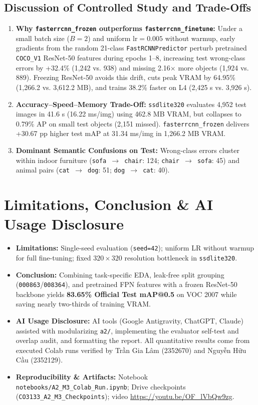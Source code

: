 \documentclass[twoside,final]{hcmut-report}
\begin{document}
\subsection{\textbf{Discussion of Controlled Study and Trade-Offs}}
\begin{enumerate}[itemsep=2pt,topsep=3pt]
    \item \textbf{Why \texttt{fasterrcnn\_frozen} outperforms \texttt{fasterrcnn\_finetune}:} Under a small batch size ($B=2$) and uniform $\text{lr}=0.005$ without warmup, early gradients from the random 21-class \texttt{FastRCNNPredictor} perturb pretrained \texttt{COCO\_V1} ResNet-50 features during epochs 1--8, increasing test wrong-class errors by +32.4\% (1,242 vs. 938) and missing 2.16$\times$ more objects (1,924 vs. 889). Freezing ResNet-50 avoids this drift, cuts peak VRAM by 64.95\% (1,266.2 vs. 3,612.2 MB), and trains 38.2\% faster on L4 (2,425 s vs. 3,926 s).
    \item \textbf{Accuracy--Speed--Memory Trade-Off:} \texttt{ssdlite320} evaluates 4,952 test images in 41.6 s (16.22 ms/img) using 462.8 MB VRAM, but collapses to 0.79\% AP on small test objects (2,151 missed). \texttt{fasterrcnn\_frozen} delivers +30.67 pp higher test mAP at 31.34 ms/img in 1,266.2 MB VRAM.
    \item \textbf{Dominant Semantic Confusions on Test:} Wrong-class errors cluster within indoor furniture (\texttt{sofa $\to$ chair}: 124; \texttt{chair $\to$ sofa}: 45) and animal pairs (\texttt{cat $\to$ dog}: 51; \texttt{dog $\to$ cat}: 40).
\end{enumerate}

\section{Limitations, Conclusion \& AI Usage Disclosure}
\begin{itemize}[itemsep=2pt,topsep=3pt]
    \item \textbf{Limitations:} Single-seed evaluation (\texttt{seed=42}); uniform LR without warmup for full fine-tuning; fixed $320\times320$ resolution bottleneck in \texttt{ssdlite320}.
    \item \textbf{Conclusion:} Combining task-specific EDA, leak-free split grouping (\texttt{000863}/\texttt{008364}), and pretrained FPN features with a frozen ResNet-50 backbone yields \textbf{83.65\% Official Test mAP@0.5} on VOC 2007 while saving nearly two-thirds of training VRAM.
    \item \textbf{AI Usage Disclosure:} AI tools (Google Antigravity, ChatGPT, Claude) assisted with modularizing \texttt{a2/}, implementing the evaluator self-test and overlap audit, and formatting the report. All quantitative results come from executed Colab runs verified by Trần Gia Lâm (2352670) and Nguyễn Hữu Cầu (2352129).
    \item \textbf{Reproducibility \& Artifacts:} Notebook \texttt{notebooks/A2\_M3\_Colab\_Run.ipynb}; Drive checkpoints (\texttt{CO3133\_A2\_M3\_Checkpoints}); video \url{https://youtu.be/OF_lVbQw9zg}.
\end{itemize}
\end{document}
